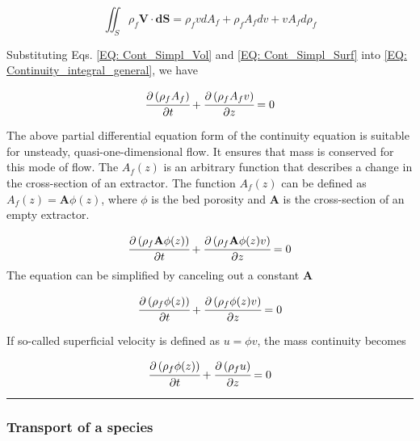 \documentclass[../Article_Model_Parameters.tex]{subfiles}
\begin{document}
	{\footnotesize
		\begin{equation}
			\iint_S \rho_f \textbf{V} \cdot \textbf{dS} = \rho_f v dA_f + \rho_f A_f dv + v A_f d\rho_f 
			\label{EQ: Cont_Simpl_Surf}
		\end{equation}
	}

	Substituting Eqs. \ref{EQ: Cont_Simpl_Vol} and \ref{EQ: Cont_Simpl_Surf} into \ref{EQ: Continuity_integral_general}, we have
	
	{\footnotesize
		\begin{equation}
			\cfrac{\partial \left( \rho_f A_f \right)}{\partial t} + \cfrac{\partial \left( \rho_f A_f v \right)}{\partial z} = 0
			\label{EQ: Conservative_continuity}
		\end{equation}
	}
	
	The above partial differential equation form of the continuity equation is suitable for unsteady, quasi-one-dimensional flow. It ensures that mass is conserved for this mode of flow. The $A_f(z)$ is an arbitrary function that describes a change in the cross-section of an extractor. The function $A_f(z)$ can be defined as $A_f(z) = \textbf{A} \phi(z)$, where $\phi$ is the bed porosity and $\textbf{A}$ is the cross-section of an empty extractor.
	
	{\footnotesize
		\begin{equation}
			\cfrac{\partial \left( \rho_f \textbf{A} \phi (z) \right)}{\partial t} + \cfrac{\partial \left( \rho_f \textbf{A} \phi (z) v \right)}{\partial z} = 0
		\end{equation}
	}
	The equation can be simplified by canceling out a constant $\textbf{A}$
	
	{\footnotesize
		\begin{equation}
			\cfrac{\partial \left( \rho_f \phi (z) \right)}{\partial t} + \cfrac{\partial \left( \rho_f \phi (z) v \right)}{\partial z} = 0
		\end{equation}
	}
	
	If so-called superficial velocity is defined as $u=\phi v$, the mass continuity becomes
	
	{\footnotesize
		\begin{equation}
			\cfrac{\partial \left( \rho_f \phi (z) \right)}{\partial t} + \cfrac{\partial \left( \rho_f u \right)}{\partial z} = 0
			\label{EQ: Mass_Continuity}
		\end{equation}
	}
	
	\hrule
	
	\subsubsection{Transport of a species}
	
\end{document}
